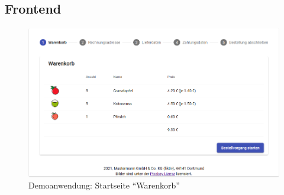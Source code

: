 







\subsection{Frontend}

\begin{figure}[H]
	\centering
	\includegraphics[width=0.75\linewidth]{img/04_erstellung-poc/demoanwendung_vorstellung_01-warenkorb.png}
	\caption{Demoanwendung: Startseite \enquote{Warenkorb}}
	\label{fig:demoanwendung_vorstellung_01-warenkorb}
\end{figure}

